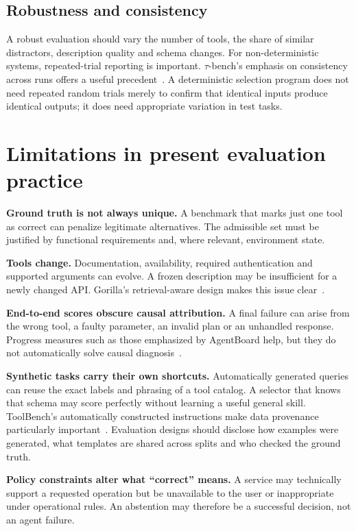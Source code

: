 \documentclass[10pt,a4paper]{article}
\begin{document}
\subsection{Robustness and consistency}
A robust evaluation should vary the number of tools, the share of similar distractors, description quality and schema changes. For non-deterministic systems, repeated-trial reporting is important. $\tau$-bench's emphasis on consistency across runs offers a useful precedent~\cite{taubench}. A deterministic selection program does not need repeated random trials merely to confirm that identical inputs produce identical outputs; it does need appropriate variation in test tasks.

\section{Limitations in present evaluation practice}
\textbf{Ground truth is not always unique.} A benchmark that marks just one tool as correct can penalize legitimate alternatives. The admissible set must be justified by functional requirements and, where relevant, environment state.

\textbf{Tools change.} Documentation, availability, required authentication and supported arguments can evolve. A frozen description may be insufficient for a newly changed API. Gorilla's retrieval-aware design makes this issue clear~\cite{gorilla}.

\textbf{End-to-end scores obscure causal attribution.} A final failure can arise from the wrong tool, a faulty parameter, an invalid plan or an unhandled response. Progress measures such as those emphasized by AgentBoard help, but they do not automatically solve causal diagnosis~\cite{agentboard}.

\textbf{Synthetic tasks carry their own shortcuts.} Automatically generated queries can reuse the exact labels and phrasing of a tool catalog. A selector that knows that schema may score perfectly without learning a useful general skill. ToolBench's automatically constructed instructions make data provenance particularly important~\cite{toolllm}. Evaluation designs should disclose how examples were generated, what templates are shared across splits and who checked the ground truth.

\textbf{Policy constraints alter what ``correct'' means.} A service may technically support a requested operation but be unavailable to the user or inappropriate under operational rules. An abstention may therefore be a successful decision, not an agent failure.
\end{document}
